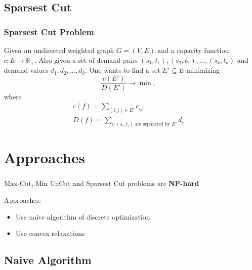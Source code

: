 \documentclass[10pt]{beamer}
\begin{document}
	\subsection{Sparsest Cut}
	
		\begin{frame}
			\frametitle{Sparsest Cut Problem}
			
			Given an undirected weighted graph $G = (V, E)$ and a capacity function 
			$c 
			: E \rightarrow \mathbb R_+$.
			Also given a set of demand pairs $(s_1, t_1), (s_2, t_2), \dots, (s_k, t_k)$ and 
			demand values $d_1, d_2, \dots, d_k$.
			One wants to find a set $E' \subseteq E$ minimizing
			\[
				\frac{c(E') }{ D(E') } \rightarrow \min,
			\]
			where
			\begin{gather*}
				c(f) = \sum\limits_{(i, j) \in E'} c_{ij} \\
				D(f) = \sum\limits_{i : (s_i, t_i) \text{ are separated by } E'} d_i
			\end{gather*}
			
		\end{frame}

\section{Approaches}

	\begin{frame}
		\frametitle{}
		
		\Large
		Max-Cut, Min UnCut and Sparsest Cut problems are {\bfseries NP-hard}
		
		\pause
		\vspace{0.5in}
		
		Approaches:
		\begin{itemize}
			\item Use naive algorithm of discrete optimization
			\item Use convex relaxations
		\end{itemize}
	\end{frame}

	\subsection{Naive Algorithm}
\end{document}
